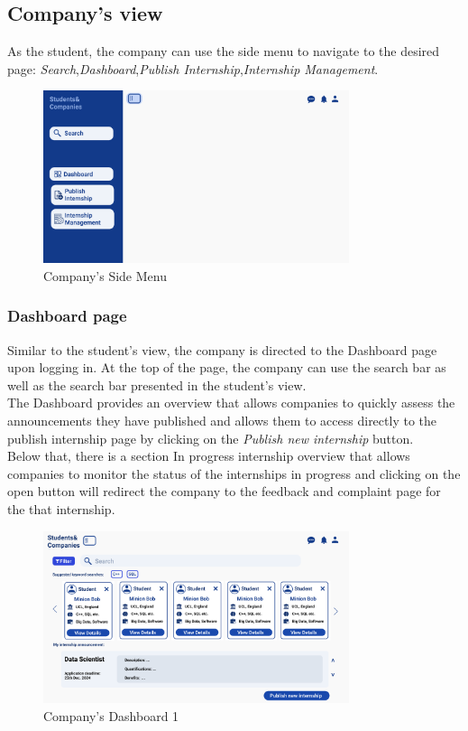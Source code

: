 \subsection{Company's view}
As the student, the company can use the side menu to navigate to the desired page:
\textit{Search},\textit{Dashboard},\textit{Publish Internship},\textit{Internship Management}.
\begin{figure}[H]
    \centering
    \includegraphics[width=0.8\textwidth]{Images/UI/Layout-Company.png}
    \caption{Company's Side Menu}\label{fig:Company_view}
\end{figure}
\subsubsection{Dashboard page}
Similar to the student's view, the company is directed to the Dashboard page upon logging in.
At the top of the page, the company can use the search bar as well as the search bar presented in the student's view.\\
The Dashboard provides an overview that allows companies to quickly assess the announcements they have published
and allows them to access directly to the publish internship page by clicking on the \textit{Publish new internship} button.\\
Below that, there is a section In progress internship overview that allows companies to monitor the status of the internships in progress 
and clicking on the open button will redirect the company to the feedback and complaint page for the that internship.\\
\begin{figure}[H]
    \centering
    \includegraphics[width=0.8\textwidth]{Images/UI/Dashboard 1-company.png}
    \caption{Company's Dashboard 1}\label{fig:DashboardCompany1}
\end{figure}

